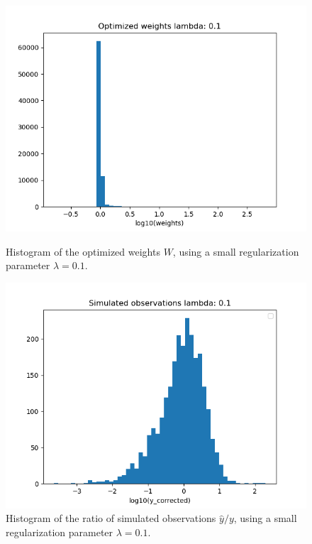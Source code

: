 \documentclass{article}
\begin{document}
\begin{figure}
	\centering
	\begin{minipage}{.48\textwidth}
		\centering
		\includegraphics[width=0.9\linewidth]{../plots/hfun_weights_lambda01.png}
		\caption{Histogram of the optimized weights $W$, using a small regularization parameter $\lambda=0.1$.}
		\label{fig: optimized weights lambda=0.1}
	\end{minipage}\hfill
	\begin{minipage}{.48\textwidth}
		\centering
		\includegraphics[width=0.9\linewidth]{../plots/hfun_simulated_observations_lambda01.png}
		\caption{Histogram of the ratio of simulated observations $\hat{y}/y$, using a small regularization parameter $\lambda=0.1$.}
		\label{fig: simulated observations lambda=0.1}
	\end{minipage}
\end{figure}
\end{document}
